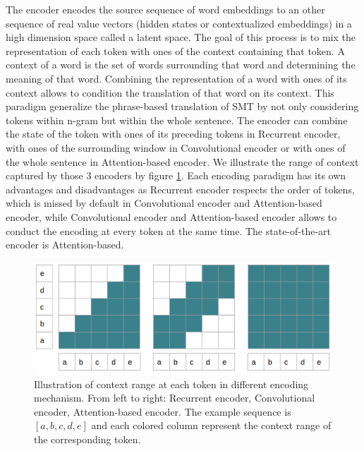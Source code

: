 The encoder encodes the source sequence of word embeddings to an other sequence of real value vectors (hidden states or contextualized embeddings) \cite{Vaswani17attention,Bahdanau15learning, Cho14properties} in a high dimension space called a latent space. The goal of this process is to mix the representation of each token with ones of the context containing that token. A context of a word is the set of words surrounding that word and determining the meaning of that word. Combining the representation of a word with ones of its context allows to condition the translation of that word on its context. This paradigm generalize the phrase-based translation of SMT by not only considering tokens within n-gram but within the whole sentence. The encoder can combine the state of the token with ones of its preceding tokens in Recurrent encoder, with ones of the surrounding window in Convolutional encoder or with ones of the whole sentence in Attention-based encoder. We illustrate the range of context captured by those 3 encoders by figure \ref{fig:encoding}. Each encoding paradigm has its own advantages and disadvantages as Recurrent encoder respects the order of tokens, which is missed by default in Convolutional encoder and Attention-based encoder, while Convolutional encoder and Attention-based encoder allows to conduct the encoding at every token at the same time. The state-of-the-art encoder is Attention-based.

\begin{figure}[htbp]
\includegraphics[width=\textwidth]{graphics/encoding.png}
\caption[Illustration of context range at each token in different encoding mechanism]{Illustration of context range at each token in different encoding mechanism. From left to right: Recurrent encoder, Convolutional encoder, Attention-based encoder. The example sequence is $[a,b,c,d,e]$ and each colored column represent the context range of the corresponding token.}
\label{fig:encoding}
\end{figure}

